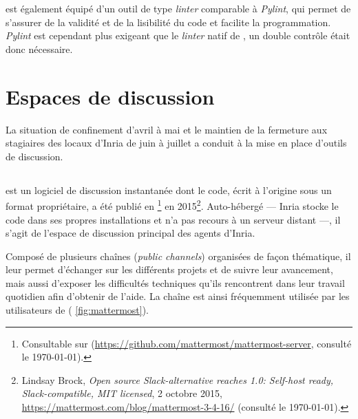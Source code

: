 \pycharm{} est également équipé d'un outil de type \textit{linter} comparable à \textit{Pylint}, qui permet de s'assurer de la validité et de la lisibilité du code et facilite la programmation. \textit{Pylint} est cependant plus exigeant que le \textit{linter} natif de \pycharm, un double contrôle était donc nécessaire.

\section{Espaces de discussion}

La situation de confinement d'avril à mai et le maintien de la fermeture aux stagiaires des locaux d'Inria de juin à juillet a conduit à la mise en place d'outils de discussion.

\subsection{\Mattermost}

\Mattermost{} est un logiciel de discussion instantanée dont le code, écrit à l'origine sous un format propriétaire, a été publié en \opensource{}\footnote{Consultable sur \github{} (\url{https://github.com/mattermost/mattermost-server}, consulté le \today).} en 2015\footnote{Lindsay Brock, \textit{Open source Slack-alternative reaches 1.0: Self-host ready, Slack-compatible, MIT licensed}, 2 octobre 2015, \url{https://mattermost.com/blog/mattermost-3-4-16/} (consulté le \today).}. Auto-hébergé --- Inria stocke le code dans ses propres installations et n'a pas recours à un serveur distant ---, il s'agit de l'espace de discussion principal des agents d'Inria.

Composé de plusieurs \og chaînes \fg{} (\textit{public channels}) organisées de façon thématique, il leur permet d'échanger sur les différents projets et de suivre leur avancement, mais aussi d'exposer les difficultés techniques qu'ils rencontrent dans leur travail quotidien afin d'obtenir de l'aide. La chaîne \og \ocr \fg{} est ainsi fréquemment utilisée par les utilisateurs de \kraken{} (\fig{} \ref{fig:mattermost}).

